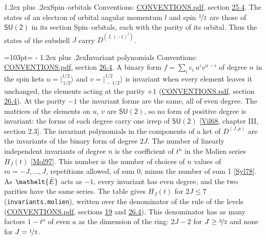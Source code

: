 \documentclass[10pt,a4paper]{article}
\makeatletter
\renewcommand\section{\@startsection{section}{1}{\z@}{-3ex plus -1ex minus -.2ex}%
  {1.2ex plus .2ex}{\normalfont\large\sffamily\bfseries\color{parttitle}}}
\newcommand{\needspace}[1]{\par\penalty-100\begingroup\dimen0=#1\relax\dimen2=\pagegoal
  \advance\dimen2-\pagetotal\ifdim\dimen0>\dimen2\relax\ifdim\dimen2>0pt\vfil\break\fi\fi
  \endgroup}
\numberwithin{equation}{section}
\newcommand{\eltfont}[1]{{\let\sigma\eltsigma\mathelt{#1}}}
\newcommand{\grp}[1]{\mathsf{#1}}
\newcommand{\elt}[1]{\eltfont{#1}}
\newcommand{\irrJp}[2]{D^{(#1,#2)}}
\newcommand{\jm}[2]{\bigl\lvert{}^{#1}_{\,#2}\bigr\rangle}
\newcommand{\barred}[1]{\bar{#1}}
\makeatother
\begin{document}
\section{Spin--orbitals}\label{s:spin_orbitals}
Conventions: \href{../../CONVENTIONS.pdf}{CONVENTIONS.pdf}, section \href{../../CONVENTIONS.pdf\#conv.25.4}{25.4}.
\leavevmode\label{n:index.orbital.l}The states of an electron of orbital angular momentum $l$ and spin $\nicefrac{1}{2}$ are those of \href{SU2.pdf}{$\grp{SU(2)}$} in its section Spin--orbitals, each with the parity of its orbital. Thus the states of the subshell $J$ carry $\irrJp{J}{(-1)^{l}}$.
\needspace{103pt}
\section{Invariant polynomials}\label{s:invariants}
Conventions: \href{../../CONVENTIONS.pdf}{CONVENTIONS.pdf}, section \href{../../CONVENTIONS.pdf\#conv.26.4}{26.4}.
\leavevmode\label{n:local.binary.form}A binary form $f = \sum_i c_i\, u^i v^{n-i}$ of degree $n$ in the spin kets $u = \jm{1/2}{1/2}$ and $v = \jm{1/2}{-1/2}$ is invariant when every element leaves it unchanged, the elements acting at the parity $+1$ (\href{../../CONVENTIONS.pdf}{CONVENTIONS.pdf}, section \href{../../CONVENTIONS.pdf\#conv.26.4}{26.4}). At the parity $-1$ the invariant forms are the same, all of even degree. The matrices of the elements on $u$, $v$ are $\grp{SU(2)}$, so no form of positive degree is invariant: the forms of each degree carry one irrep of $\grp{SU(2)}$ [\href{../../../REFERENCES.pdf\#ref.Vil68}{Vil68}, chapter III, section 2.3].
The invariant polynomials in the components of a ket of $\irrJp{J}{p}$ are the invariants of the binary form of degree $2J$. \label{n:function.hilbert}The number of linearly independent invariants of degree $n$ is the coefficient of $t^n$ in the Molien series $H_J(t)$ [\href{../../../REFERENCES.pdf\#ref.Mol97}{Mol97}]. This number is the number of choices of $n$ values of $m = -J, \dots, J$, repetitions allowed, of sum 0, minus the number of sum 1 [\href{../../../REFERENCES.pdf\#ref.Syl78}{Syl78}]. As $\elt{\barred{E}}$ acts as $-1$, every invariant has even degree, and the two parities have the same series. The table gives $H_J(t)$ for $2J \le 7$ (\texttt{invariants.molien}), written over the denominator of the rule of the levels (\href{../../CONVENTIONS.pdf}{CONVENTIONS.pdf}, sections \href{../../../rotation/CONVENTIONS.pdf\#conv.19}{19} and \href{../../CONVENTIONS.pdf\#conv.26.4}{26.4}). This denominator has as many factors $1 - t^{a}$ of even $a$ as the dimension of the ring: $2J - 2$ for $J \ge \nicefrac{3}{2}$ and none for $J = \nicefrac{1}{2}$.
\end{document}
